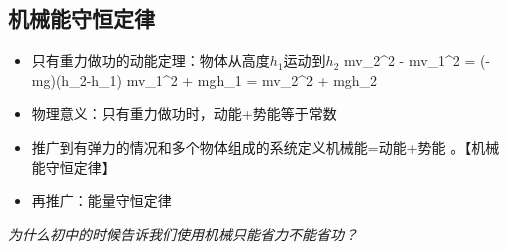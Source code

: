 \documentclass[a4paper,9pt]{ctexart}
\begin{document}
\subsection{机械能守恒定律}
\begin{itemize}
\item
只有重力做功的动能定理：物体从高度$h_1$运动到$h_2$
\beq
{}mv_2^2 - mv_1^2 = (-mg)(h_2-h_1)
\eeq
\so
\beq
{}mv_1^2 + mgh_1 = mv_2^2  + mgh_2
\eeq
\item
物理意义：只有重力做功时，动能+势能等于常数
\item
推广到有弹力的情况和多个物体组成的系统\so 定义机械能=动能+势能 \so {}。【机械能守恒定律】
\item
再推广：能量守恒定律
\end{itemize}
\emph{为什么初中的时候告诉我们使用机械只能省力不能省功？}
\end{document}
